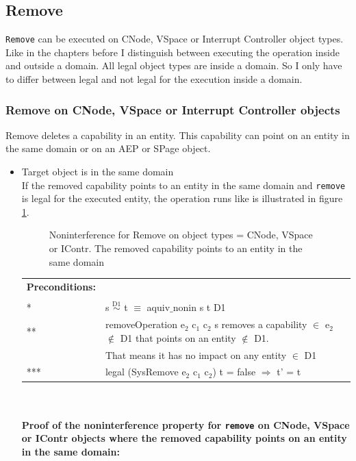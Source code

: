 \documentclass[11pt,a4paper,twoside]{article}
\begin{document}
{\subsection{Remove}\label{sec:Remove}
\texttt{Remove} can be executed on CNode, VSpace or Interrupt Controller object types. \\
Like in the chapters before I distinguish between executing the operation inside and outside a domain. All legal object types are inside a domain. So I only have to differ between legal and not legal for the execution inside a domain. 
\subsubsection{Remove on CNode, VSpace or Interrupt Controller objects} 
Remove deletes a capability in an entity. This capability can point on an entity in the same domain or on an AEP or SPage object. 
\begin{itemize}
\item Target object is in the same domain \\
If the removed capability points to an entity in the same domain and  \texttt{remove} is legal for the executed entity, the operation runs like is illustrated in figure \ref{fig:RemoveCNode}.
\begin{flushleft}
\begin{figure}[H]
\caption{Noninterference for Remove on object types = CNode, VSpace or IContr. The removed capability points to an entity in the same domain}
\label{fig:RemoveCNode}
\end{figure}
\end{flushleft}
\begin{tabular}{ll}
\textbf{Preconditions:} \\ \\
* & s $\overset{\text{D1}}{\sim}$ t $\equiv$ aquiv$\_$nonin s t D1	\\ 
** & removeOperation e$_2$ c$_1$ c$_2$ s removes a capability $\in$ e$_2$ $\notin$ D1 that points on an entity $\notin$ D1. \\
& That means it has no impact on any entity $\in$ D1 \\ 
*** & legal (SysRemove e$_2$ c$_1$ c$_2$) t = false $\Rightarrow$ t' = t
\end{tabular} \\ \\ 
\textbf{Proof of the noninterference property for \texttt{remove} on CNode, VSpace or IContr objects where the removed capability points on an entity in the same domain:}\\ \\

\end{itemize}}
\end{document}
